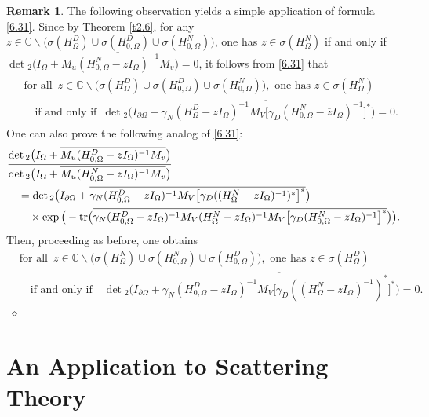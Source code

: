 \documentclass[reqno,10pt, centertags]{amsart}
\newcommand{\bbC}{{\mathbb{C}}}
\newcommand{\no}{\nonumber}
\newcommand{\lb}{\label}
\newcommand{\ol}{\overline}
\newcommand{\ga}{\gamma}
\newcommand{\si}{\sigma}
\newcommand{\Om}{\Omega}
\newcommand{\dOm}{{\partial\Omega}}
\newcommand{\tr}{\text{\rm{tr}}}
\numberwithin{equation}{section}
\theoremstyle{definition}
\newtheorem{remark}[theorem]{Remark}
\begin{document}
\begin{remark}  \lb{r6.14}
The following observation yields a simple
application of formula \eqref{6.31}. Since by Theorem \ref{t2.6}, for any
$z\in\bbC\backslash \big(\si(H_{\Om}^D)\cup
\si(H_{0,\Om}^D) \cup \si(H_{0,\Om}^N)\big)$,
one has $z\in\si(H_{\Om}^N)$ if and
only if $\det{}_2\big(I_{\Om}+
\ol{M_u(H_{0,\Om}^N -zI_{\Om})^{-1}M_v}\big)=0$, it follows
from \eqref{6.31} that
\begin{align}
\begin{split}
&\text{for all } \, z\in\bbC\backslash \big(\si(H_{\Om}^D)\cup
\si(H_{0,\Om}^D) \cup \si(H_{0,\Om}^N)\big), \text{ one has }
z\in\si(H_{\Om}^N)  \\
&\quad \text{if and only if } \, \det{}_2\big( I_{\dOm} -
\ol{\ga_N(H_{\Om}^D-zI_{\Om})^{-1}M_V
\big[\ga_D(H_{0,\Om}^N-\ol{z}I_{\Om})^{-1}\big]^*}
\big)=0.
\end{split}
\end{align}
One can also prove the following analog of \eqref{6.31}:
\begin{align}
&\frac{\det{}_2\big(I_{\Om}+\ol{M_u(H_{0,\Om}^D-zI_{\Om})^{-1}M_v}\big)}
{\det{}_2\big(I_{\Om}+\ol{M_u(H_{0,\Om}^N-zI_{\Om})^{-1}M_v}\big)} \no \\
&\quad = \det{}_2\big(I_{\dOm} +
\ol{\ga_N(H_{0,\Om}^D-zI_{\Om})^{-1}M_V
\big[\ga_D((H_{\Om}^N-z I_{\Om})^{-1})^*\big]^*}\big)
\lb{6.90} \\
&\quad\quad \times \exp\big(-\tr\big(
\ol{\ga_N(H_{0,\Om}^D-zI_{\Om})^{-1}M_V
(H_{\Om}^N-zI_{\Om})^{-1}M_V
\big[\ga_D(H_{0,\Om}^N-\ol{z}I_{\Om})^{-1}\big]^*}
\big)\big). \no
\end{align}
Then, proceeding as before, one obtains
\begin{align}
& \text{for all } \, z \in \bbC \backslash
\big(\si(H_{\Om}^N)\cup\si(H_{0,\Om}^N)\cup\si(H_{0,\Om}^D)\big),
\text{ one has } z\in\si(H_{\Om}^D) \\
&\quad\text{if and only if}\quad \det{}_2\big(I_{\dOm} +
\ol{\ga_N(H_{0,\Om}^D-zI_{\Om})^{-1}M_V
\big[\ga_D((H_{\Om}^N-z I_{\Om})^{-1})^*\big]^*} \big)=0.  \no
\end{align}
${}$ \hfill $\diamond$
\end{remark}


\section{An Application to Scattering Theory} \lb{s7}
\end{document}
